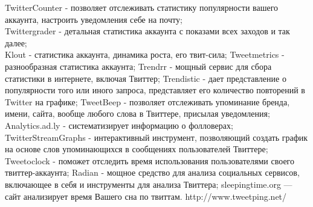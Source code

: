 \begin{chap1}
\begin{itemize}
TwitterCounter - позволяет отслеживать статистику популярности вашего аккаунта, настроить уведомления себе на почту;\\
Twittergrader - детальная статистика аккаунта с показами всех заходов и так далее;\\
Klout - статистика аккаунта, динамика роста, его твит-сила;
Tweetmetrics - разнообразная статистика аккаунта;
Trendrr - мощный сервис для сбора статистики в интернете, включая Твиттер;
Trendistic - дает представление о популярности того или иного запроса, представляет его количество повторений в Twitter на графике;
TweetBeep - позволяет отслеживать упоминание бренда, имени, сайта, вообще любого слова в Твиттере, присылая уведомления;
Analytics.ad.ly - систематизирует информацию о фолловерах;
TwitterStreamGraphs - интерактивный инструмент, позволяющий создать график на основе слов упоминающихся в сообщениях пользователей Твиттере;
Tweetoclock - поможет отследить время использования пользователями своего твиттер-аккаунта;
Radian - мощное средство для анализа социальных сервисов, включающее в себя и инструменты для анализа Твиттера;
sleepingtime.org — сайт анализирует время Вашего сна по твиттам.
http://www.tweetping.net/
\end{itemize}


\end{chap1}
